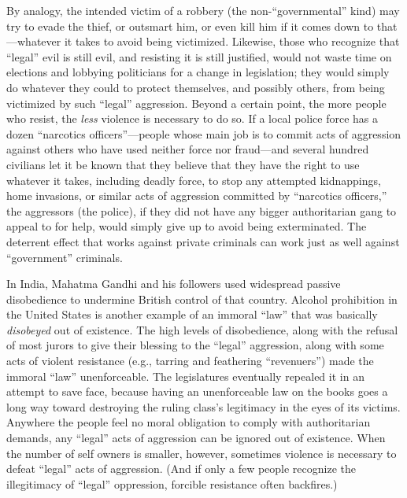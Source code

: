 \documentclass{book}
\begin{document}
By analogy, the intended victim of a robbery (the non-\enquote{governmental} kind) may try to evade the thief, or outsmart him, or even kill him if it comes down to that---whatever it takes to avoid being victimized. Likewise, those who recognize that \enquote{legal} evil is still evil, and resisting it is still justified, would not waste time on elections and lobbying politicians for a change in legislation; they would simply do whatever they could to protect themselves, and possibly others, from being victimized by such \enquote{legal} aggression. Beyond a certain point, the more people who resist, the \emph{less} violence is necessary to do so. If a local police force has a dozen \enquote{narcotics officers}---people whose main job is to commit acts of aggression against others who have used neither force nor fraud---and several hundred civilians let it be known that they believe that they have the right to use whatever it takes, including deadly force, to stop any attempted kidnappings, home invasions, or similar acts of aggression committed by \enquote{narcotics officers,} the aggressors (the police), if they did not have any bigger authoritarian gang to appeal to for help, would simply give up to avoid being exterminated. The deterrent effect that works against private criminals can work just as well against \enquote{government} criminals.

In India, Mahatma Gandhi and his followers used widespread passive disobedience to undermine British control of that country. Alcohol prohibition in the United States is another example of an immoral \enquote{law} that was basically \emph{disobeyed} out of existence. The high levels of disobedience, along with the refusal of most jurors to give their blessing to the \enquote{legal} aggression, along with some acts of violent resistance (e.g., tarring and feathering \enquote{revenuers}) made the immoral \enquote{law} unenforceable. The legislatures eventually repealed it in an attempt to save face, because having an unenforceable law on the books goes a long way toward destroying the ruling class's legitimacy in the eyes of its victims. Anywhere the people feel no moral obligation to comply with authoritarian demands, any \enquote{legal} acts of aggression can be ignored out of existence. When the number of self owners is smaller, however, sometimes violence is necessary to defeat \enquote{legal} acts of aggression. (And if only a few people recognize the illegitimacy of \enquote{legal} oppression, forcible resistance often backfires.)
\end{document}
